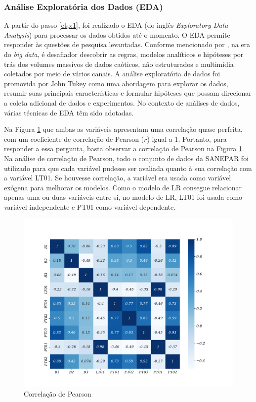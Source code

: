 \subsubsection{An\'alise Explorat\'oria dos Dados (EDA)}

A partir do passo \ref{etp:1}, foi realizado o EDA (do inglês \textit{Exploratory Data Analysis}) para processar os dados obtidos até o momento. O EDA permite responder às questões de pesquisa levantadas. Conforme mencionado por , na era do \textit{big data}, é desafiador descobrir as regras, modelos analíticos e hipóteses por trás dos volumes massivos de dados caóticos, não estruturados e multimídia coletados por meio de vários canais. A análise exploratória de dados foi promovida por John Tukey como uma abordagem para explorar os dados, resumir suas principais características e formular hipóteses que possam direcionar a coleta adicional de dados e experimentos. No contexto de análises de dados, várias técnicas de EDA têm sido adotadas.

Na Figura \ref{fig:person} que ambas as variáveis apresentam uma correlação quase perfeita, com um coeficiente de correlação de Pearson ($r$) igual a $1$. Portanto, para responder a essa pergunta, basta observar a correlação de Pearson na Figura \ref{fig:person}. Na análise de correlação de Pearson, todo o conjunto de dados da SANEPAR foi utilizado para que cada variável pudesse ser avaliada quanto à sua correlação com a variável LT01. Se houvesse correlação, a variável era usada como variável exógena para melhorar os modelos. Como o modelo de LR consegue relacionar apenas uma ou duas variáveis entre si, no modelo de LR, LT01 foi usada como variável independente e PT01 como variável dependente.

\begin{figure}[H]
	\centering
	\caption{Correlação de Pearson}
	\label{fig:person}
	\includegraphics[width=0.9\linewidth]{Apendices/Figuras/modelagem-24h/person}
	
	
\end{figure}

